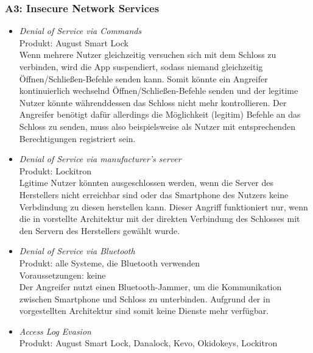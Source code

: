     \subsubsection*{A3: Insecure Network Services}
        \begin{itemize}[leftmargin=0cm,label={}]
            \item \emph{Denial of Service via Commands}\cite{Ye2017}\label{vuln:doscmd}\\
    	        Produkt: August Smart Lock \\ 
                Wenn mehrere Nutzer gleichzeitig versuchen sich mit dem Schloss zu verbinden, wird die App suspendiert, sodass niemand gleichzeitig Öffnen/\-Schließen-Befehle senden kann. 
    		    Somit könnte ein Angreifer kontinuierlich wechselnd Öffnen/Schließen-Befehle senden und der legitime Nutzer könnte währenddessen das Schloss nicht mehr kontrollieren. 
    		    Der Angreifer benötigt dafür allerdings die Möglichkeit (legitim) Befehle an das Schloss zu senden, muss also beispielsweise als Nutzer mit entsprechenden Berechtigungen registriert sein.
		    \item \emph{Denial of Service via manufacturer's server}\cite{Ye2017}\label{vuln:dosserver}\\
                Produkt: Lockitron\\
                Lgitime Nutzer könnten ausgeschlossen werden, wenn die Server des Herstellers nicht erreichbar sind oder das Smartphone des Nutzers keine Verbdindung zu diesen herstellen kann.
                Dieser Angriff funktioniert nur, wenn die in  vorstellte Architektur mit der direkten Verbindung des Schlosses mit den Servern des Herstellers gewählt wurde.
                \newpage
            \item \emph{Denial of Service via Bluetooth}\cite{Ye2017}\label{vuln:dosble}\\
    	        Produkt: alle Systeme, die Bluetooth verwenden\\ 
                Voraussetzungen: keine\\
                Der Angreifer nutzt einen Bluetooth-Jammer, um die Kommunikation zwischen Smartphone und Schloss zu unterbinden. 
                Aufgrund der in  vorgestellten Architektur sind somit keine Dienste mehr verfügbar. 
            \item \emph{Access Log Evasion}\cite{Ho2016}\label{vuln:accesslogevasion}\\
                Produkt: August Smart Lock, Danalock, Kevo, Okidokeys, Lockitron\\

\end{itemize}

